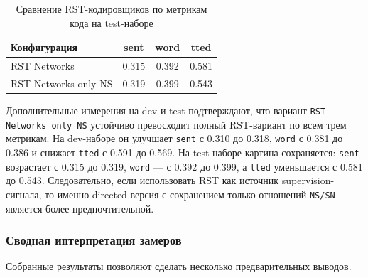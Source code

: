 \documentclass[12pt,a4paper]{article}
\begin{document}
\begin{table}[H]
\centering
\caption{Сравнение RST-кодировщиков по метрикам кода на test-наборе}
\begin{tabular}{lccc}
\toprule
Конфигурация & sent & word & tted \\
\midrule
RST Networks & 0.315 & 0.392 & 0.581 \\
RST Networks only NS & 0.319 & 0.399 & 0.543 \\
\bottomrule
\end{tabular}
\end{table}

Дополнительные измерения на dev и test подтверждают, что вариант
\texttt{RST Networks only NS} устойчиво превосходит полный RST-вариант по всем трем
метрикам. На dev-наборе он улучшает \texttt{sent} с 0.310 до 0.318, \texttt{word}
с 0.381 до 0.386 и снижает \texttt{tted} с 0.591 до 0.569. На test-наборе картина
сохраняется: \texttt{sent} возрастает с 0.315 до 0.319, \texttt{word} --- с 0.392 до
0.399, а \texttt{tted} уменьшается с 0.581 до 0.543. Следовательно, если использовать
RST как источник supervision-сигнала, то именно directed-версия с сохранением только
отношений \texttt{NS/SN} является более предпочтительной.

\subsubsection{Сводная интерпретация замеров}

Собранные результаты позволяют сделать несколько предварительных выводов.
\end{document}
